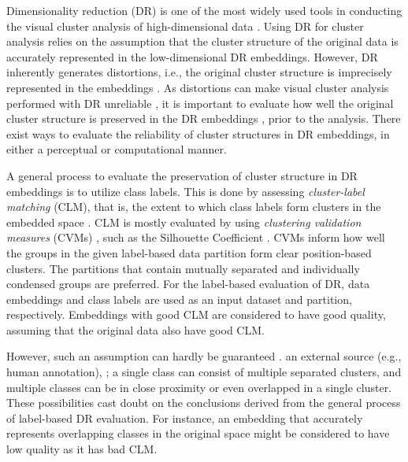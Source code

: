 


Dimensionality reduction (DR) is one of the most widely used tools in conducting the visual cluster analysis of high-dimensional data \cite{ jiazhi21tvcg, pezzotti16cgf, jeon22arxiv, kwon18tvcg, quadri21tvcg, quadri22tvcg}. Using DR for cluster analysis relies on the assumption that the cluster structure of the original data is accurately represented in the low-dimensional DR embeddings. However, DR inherently generates distortions, i.e., the original cluster structure is imprecisely represented in the embeddings \cite{aupetit07neurocomputing, aupetit14vast, heulot13vamp, lespinats07tnn, lespinats11cgf}. As distortions can make visual cluster analysis performed with DR unreliable \cite{jeon21tvcg, jeon22arxiv},  it is important to evaluate how well the original cluster structure is preserved in the DR embeddings \cite{jiazhi21tvcg, jeon21tvcg, martins14cg, joia11lamp}, prior to the analysis. There exist ways to evaluate the reliability of cluster structures in DR embeddings, in either a perceptual \cite{etemadpour15ivapp, jiazhi21tvcg, sedlmair13tvcg} or computational \cite{jeon21tvcg, venna06nn, lee07springer, motta15neurocomputing} manner.

A general process to evaluate the preservation of cluster structure in DR embeddings is to utilize class labels. 
This is done by assessing \textit{cluster-label matching} (CLM), that is, the extent to which class labels form clusters in the embedded space \cite{joia11lamp, loch15neurocomputing, xia22tvcg, becht19nature, xiang21fig, yang21cellreports}.
CLM is mostly evaluated by using \textit{clustering validation measures} (CVMs) \cite{liu10icdm, wu09kdd}, such as the Silhouette Coefficient \cite{rousseuw87silhouette}.
CVMs inform how well the groups in the given label-based data partition form clear position-based clusters.
The partitions that contain mutually separated and individually condensed groups are preferred. 
For the label-based evaluation of DR, data embeddings and class labels are used as an input dataset and partition, respectively.
Embeddings with good CLM are considered to have good quality, assuming that the original data also have good CLM.

However, such an assumption can hardly be guaranteed \cite{aupetit14beliv, jiazhi21tvcg, farber10multiclust, jeon22arxiv2}.
 an external source (e.g., human annotation), ;
a single class can consist of multiple separated clusters, and multiple classes can be in close proximity or even overlapped \cite{aupetit14beliv} in a single cluster. 
These possibilities cast doubt on the conclusions derived from the general process of  label-based DR evaluation. 
For instance, an embedding that accurately represents overlapping classes in the original space might be considered to have low quality as it has bad CLM.




